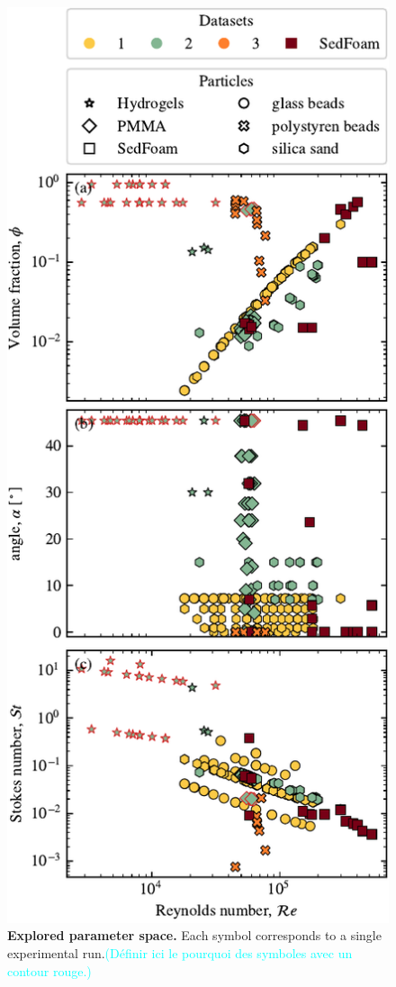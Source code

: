\documentclass[twocolumn]{article}
\newcommand*{\marie}{\textcolor{Cyan}}
\begin{document}
\begin{figure}
	\centering
	\includegraphics{figure2.pdf}
	\caption{\textbf{Explored parameter space.} Each symbol corresponds to a single experimental run.\marie{(Définir ici le pourquoi des symboles avec un contour rouge.)}}
	\label{fig:fig2}
\end{figure}
\end{document}
